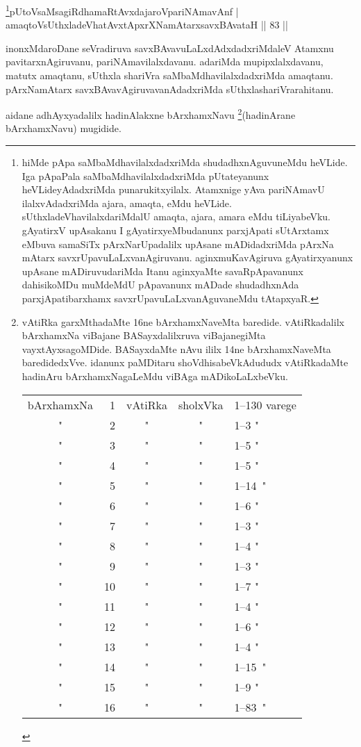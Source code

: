 \begin{shl}
\footnote{hiMde pApa saMbaMdhavilalxdadxriMda shudadhxnAguvuneMdu 
heVLide. Iga pApaPala saMbaMdhavilalxdadxriMda pUtateyanunx 
heVLideyAdadxriMda punarukitxyilalx. Atamxnige yAva pariNAmavU 
ilalxvAdadxriMda ajara, amaqta, eMdu heVLide. 
sUthxladeVhavilalxdariMdalU amaqta, ajara, amara eMdu tiLiyabeVku. 
gAyatirxV upAsakanu I gAyatirxyeMbudanunx parxjApati sUtArxtamx eMbuva 
samaSiTx pArxNarUpadalilx upAsane mADidadxriMda pArxNa mAtarx 
savxrUpavuLaLxvanAgiruvanu. aginxmuKavAgiruva gAyatirxyanunx upAsane 
mADiruvudariMda Itanu aginxyaMte savaRpApavanunx dahisikoMDu muMdeMdU 
pApavanunx mADade shudadhxnAda parxjApatibarxhamx 
savxrUpavuLaLxvanAguvaneMdu tAtapxyaR.}pUtoV\s saMsagiRdhamaRtAvxdajaroV\s pariNAmavAnf | \\
amaqtoV\s sUthxladeVhatAvxtApxrXNamAtarxsavxBAvataH \hfill||  83 || 
\end{shl}

\begin{artha} 
inonxMdaroDane seVradiruva savxBAvavuLaLxdAdxdadxriMdaleV Atamxnu 
pavitarxnAgiruvanu, pariNAmavilalxdavanu. adariMda mupipxlalxdavanu, 
matutx amaqtanu, sUthxla shariVra saMbaMdhavilalxdadxriMda amaqtanu. 
pArxNamAtarx savxBAvavAgiruvavanAdadxriMda sUthxlashariVrarahitanu.
\end{artha}

aidane adhAyxyadalilx hadinAlakxne bArxhamxNavu 
\footnote{vAtiRka garxMthadaMte 16ne bArxhamxNaveMta baredide. 
vAtiRkadalilx bArxhamxNa viBajane BASayxdalilxruva viBajanegiMta 
vayxtAyxsagoMDide. BASayxdaMte nAvu ililx 14ne bArxhamxNaveMta 
baredidedxVve. idanunx paMDitaru shoVdhisabeVkAdududx vAtiRkadaMte 
hadinAru bArxhamxNagaLeMdu viBAga mADikoLaLxbeVku.\\ 
\begin{tabular}{crccl}bArxhamxNa & 1 & vAtiRka & sholxVka & 1{\rm --}130 
varege\\
" & 2 & " & " & 1{\rm --}3 \qquad "\\
" & 3 & " & " & 1{\rm --}5 \qquad "\\ 
" & 4 & " & " & 1{\rm --}5 \qquad "\\
" & 5 & " & " & 1{\rm --}14 \quad \,"\\ 
" & 6 & " & " & 1{\rm --}6 \qquad "\\
" & 7 & " & " & 1{\rm --}3 \qquad "\\
" & 8 & " & " & 1{\rm --}4 \qquad "\\
" & 9 & " & " & 1{\rm --}3 \qquad "\\
" & 10 & " & " & 1{\rm --}7 \qquad "\\
" & 11 & " & " & 1{\rm --}4 \qquad "\\
" & 12 & " & " & 1{\rm --}6 \qquad "\\
" & 13 & " & " & 1{\rm --}4 \qquad "\\
" & 14 & " & " & 1{\rm --}15 \quad \,"\\
" & 15 & " & " & 1{\rm --}9 \qquad "\\
" & 16 & " & " & 1{\rm --}83 \quad \,"\end{tabular}}(hadinArane bArxhamxNavu) mugidide.

\eject
